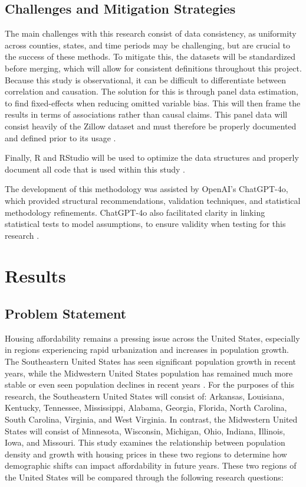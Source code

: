 \documentclass[journal,article,submit,pdftex,moreauthors]{Definitions/mdpi}
\begin{document}
\subsection{Challenges and Mitigation Strategies}

The main challenges with this research consist of data consistency, as uniformity across counties, states, and time periods may be challenging, but are crucial to the success of these methods. To mitigate this, the datasets will be standardized before merging, which will allow for consistent definitions throughout this project. Because this study is observational, it can be difficult to differentiate between correlation and causation. The solution for this is through panel data estimation, to find fixed-effects when reducing omitted variable bias. This will then frame the results in terms of associations rather than causal claims. This panel data will consist heavily of the Zillow dataset and must therefore be properly documented and defined prior to its usage \citep{zillow_2024_housing}.

Finally, R and RStudio will be used to optimize the data structures and properly document all code that is used within this study \citep{rcoreteam_2024_r}.

\medskip

The development of this methodology was assisted by OpenAI’s ChatGPT-4o, which provided structural recommendations, validation techniques, and statistical methodology refinements. ChatGPT-4o also facilitated clarity in linking statistical tests to model assumptions, to ensure validity when testing for this research \citep{openai_2025_chatgpt}.


\section{Results}

\subsection{Problem Statement}

Housing affordability remains a pressing issue across the United States, especially in regions experiencing rapid urbanization and increases in population growth. The Southeastern United States has seen significant population growth in recent years, while the Midwestern United States population has remained much more stable or even seen population declines in recent years \citep{biernackalievestro_2023_southern}. For the purposes of this research, the Southeastern United States will consist of: Arkansas, Louisiana, Kentucky, Tennessee, Mississippi, Alabama, Georgia, Florida, North Carolina, South Carolina, Virginia, and West Virginia. In contrast, the Midwestern United States will consist of Minnesota, Wisconsin, Michigan, Ohio, Indiana, Illinois, Iowa, and Missouri. This study examines the relationship between population density and growth with housing prices in these two regions to determine how demographic shifts can impact affordability in future years. These two regions of the United States will be compared through the following research questions:
\end{document}
